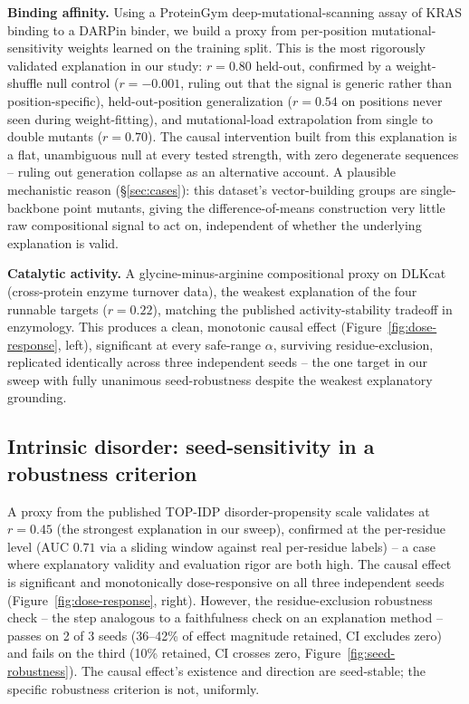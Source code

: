 \documentclass{article}
\begin{document}
\textbf{Binding affinity.} Using a ProteinGym deep-mutational-scanning
assay of KRAS binding to a DARPin binder, we build a proxy from
per-position mutational-sensitivity weights learned on the training
split. This is the most rigorously validated explanation in our study:
$r=0.80$ held-out, confirmed by a weight-shuffle null control ($r=-0.001$,
ruling out that the signal is generic rather than position-specific),
held-out-position generalization ($r=0.54$ on positions never seen
during weight-fitting), and mutational-load extrapolation from single to
double mutants ($r=0.70$). The causal intervention built from this
explanation is a flat, unambiguous null at every tested strength, with
zero degenerate sequences -- ruling out generation collapse as an
alternative account. A plausible mechanistic reason
(\S\ref{sec:cases}): this dataset's vector-building groups are
single-backbone point mutants, giving the difference-of-means
construction very little raw compositional signal to act on, independent
of whether the underlying explanation is valid.

\textbf{Catalytic activity.} A glycine-minus-arginine compositional
proxy on DLKcat (cross-protein enzyme turnover data), the weakest
explanation of the four runnable targets ($r=0.22$), matching the
published activity-stability tradeoff in enzymology. This produces a
clean, monotonic causal effect (Figure~\ref{fig:dose-response}, left),
significant at every safe-range $\alpha$, surviving residue-exclusion,
replicated identically across three independent seeds -- the one target
in our sweep with fully unanimous seed-robustness despite the weakest
explanatory grounding.

\subsection{Intrinsic disorder: seed-sensitivity in a robustness criterion}
\label{sec:disorder-detail}

A proxy from the published TOP-IDP disorder-propensity scale
\citep{campen2008topidp} validates at $r=0.45$ (the strongest explanation
in our sweep), confirmed at the per-residue level (AUC $0.71$ via a
sliding window against real per-residue labels) -- a case where
explanatory validity and evaluation rigor are both high. The causal
effect is significant and monotonically dose-responsive on all three
independent seeds (Figure~\ref{fig:dose-response}, right). However, the
residue-exclusion robustness check -- the step analogous to a faithfulness
check on an explanation method -- passes on 2 of 3 seeds (36--42\% of
effect magnitude retained, CI excludes zero) and fails on the third (10\%
retained, CI crosses zero, Figure~\ref{fig:seed-robustness}). The causal
effect's existence and direction are seed-stable; the specific robustness
criterion is not, uniformly.
\end{document}
